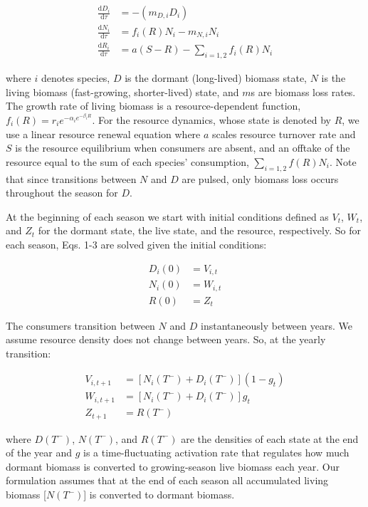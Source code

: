 \documentclass[12pt,]{article}
\begin{document}
\begin{align}
\frac{\text{d}D_{i}}{\text{d}\tau} &= -(m_{D,i}D_{i})\\
\frac{\text{d}N_{i}}{\text{d}\tau} &= f_{i}(R)N_{i} - m_{N,i}N_{i}\\
\frac{\text{d}R_{i}}{\text{d}\tau} &= a(S - R) - \sum\limits_{i=1,2}f_{i}(R)N_{i}
\end{align}

where $i$ denotes species, $D$ is the dormant (long-lived) biomass
state, $N$ is the living biomass (fast-growing, shorter-lived) state,
and $m$s are biomass loss rates. The growth rate of living biomass is a
resource-dependent function,
$f_{i}(R) = r_{i}e^{-\alpha_{i}e^{-\beta_{i}R}}$. For the resource
dynamics, whose state is denoted by $R$, we use a linear resource
renewal equation where $a$ scales resource turnover rate and $S$ is the
resource equilibrium when consumers are absent, and an offtake of the
resource equal to the sum of each species' consumption,
$\sum_{i=1,2}f(R)N_{i}$. Note that since transitions between $N$ and $D$
are pulsed, only biomass loss occurs throughout the season for $D$.

At the beginning of each season we start with initial conditions defined
as $V_{t}$, $W_{t}$, and $Z_{t}$ for the dormant state, the live state,
and the resource, respectively. So for each season, Eqs. 1-3 are solved
given the initial conditions:

\begin{align}
  D_{i}(0) &= V_{i,t} \\
  N_{i}(0) &= W_{i,t} \\
  R(0) &= Z_{t}
\end{align}

The consumers transition between $N$ and $D$ instantaneously between
years. We assume resource density does not change between years. So, at
the yearly transition:

\begin{align}
  V_{i,t+1} &= [N_{i}(T^-)+D_{i}(T^-)](1-g_{t}) \\
  W_{i,t+1} &= [N_{i}(T^-)+D_{i}(T^-)]g_{t} \\
  Z_{t+1} &= R(T^-)
\end{align}

where $D(T^-)$, $N(T^-)$, and $R(T^-)$ are the densities of each state
at the end of the year and $g$ is a time-fluctuating activation rate
that regulates how much dormant biomass is converted to growing-season
live biomass each year. Our formulation assumes that at the end of each
season all accumulated living biomass {[}$N(T^-)${]} is converted to
dormant biomass.
\end{document}
